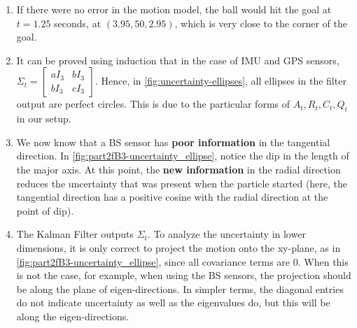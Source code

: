 \begin{enumerate}
    \item If there were no error in the motion model, the ball would hit the goal at $t = 1.25$ seconds, at $(3.95, 50, 2.95)$, which is very close to the corner of the goal.

    \item It can be proved using induction that in the case of IMU and GPS sensors, $\Sigma_t = \begin{bmatrix}
        a I_3 & b I_3\\
        b I_3 & c I_3
    \end{bmatrix}$. Hence, in \autoref{fig:uncertainty-ellipses}, all ellipses in the filter output are perfect circles. This is due to the particular forms of $A_t, R_t, C_t, Q_t$ in our setup.
    
    \item We now know that a BS sensor has \textbf{poor information} in the tangential direction. In \autoref{fig:part2fB3-uncertainty_ellipse}, notice the dip in the length of the major axis. At this point, the \textbf{new information} in the radial direction reduces the uncertainty that was present when the particle started (here, the tangential direction has a positive cosine with the radial direction at the point of dip).

    \item The Kalman Filter outputs $\Sigma_t$. To analyze the uncertainty in lower dimensions, it is only correct to project the motion onto the xy-plane, as in \autoref{fig:part2fB3-uncertainty_ellipse}, since all covariance terms are $0$. When this is not the case, for example, when using the BS sensors, the projection should be along the plane of eigen-directions. In simpler terms, the diagonal entries do not indicate uncertainty as well as the eigenvalues do, but this will be along the eigen-directions.
\end{enumerate}
